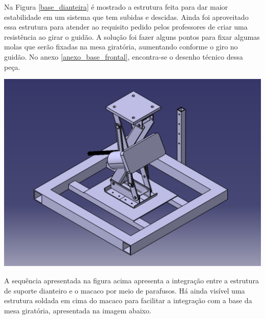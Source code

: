     Na Figura \ref{base_dianteira} é mostrado a estrutura feita para dar maior estabilidade em um sistema que tem subidas e descidas. Ainda foi aproveitado essa estrutura para atender ao requisito pedido pelos professores de criar uma resistência ao girar o guidão. A solução foi fazer alguns pontos para fixar algumas molas que serão fixadas na mesa giratória, aumentando conforme o giro no guidão. No anexo \ref{anexo_base_frontal}, encontra-se o desenho técnico dessa peça.
    
        \begin{center}
        \includegraphics[scale=0.5]{figuras/Base_dianteira_macaco}
        \label{base_dianteira_macaco}
    \end{center}  
    
    A sequência apresentada na figura acima apresenta a integração entre a estrutura de suporte dianteiro e o macaco por meio de parafusos. Há ainda visível uma estrutura soldada em cima do macaco para facilitar a integração com a base da mesa giratória, apresentada na imagem abaixo.
    
